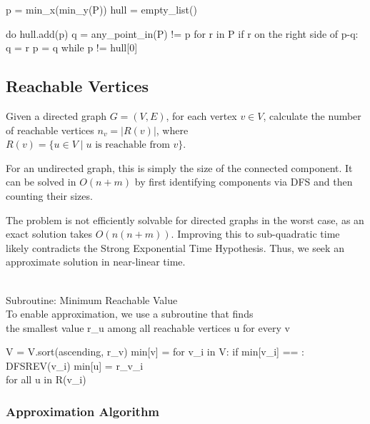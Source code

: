 \begin{codeexample}
	p = min_x(min_y(P))
	hull = empty_list()

	do {
			hull.add(p)
			q = any_point_in(P) != p
			for r in P {
					if r on the right side of p-q:
					q = r
				}
			p = q
		} while p != hull[0]
\end{codeexample}

\subsection{Reachable Vertices}

\begin{definition}
	Given a directed graph $G=(V, E)$, for each vertex $v \in V$, calculate the number of reachable vertices $n_v = |R(v)|$, where $R(v) = \{ u \in V \mid u \text{ is reachable from } v \}$.
\end{definition}

\begin{remark}
	For an undirected graph, this is simply the size of the connected component. It can be solved in $O(n+m)$ by first identifying components via DFS and then counting their sizes.
\end{remark}

\begin{remark}
	The problem is not efficiently solvable for directed graphs in the worst case, as an exact solution takes $O(n(n+m))$. Improving this to sub-quadratic time likely contradicts the Strong Exponential Time Hypothesis. Thus, we seek an approximate solution in near-linear time.
\end{remark}

\begin{algorithm}
	\\Subroutine: Minimum Reachable Value
	\\To enable approximation, we use a subroutine that finds
	\\the smallest value r_u among all reachable vertices u for every v

	V = V.sort(ascending, r_v)
	min[v] = \infty
	for v_i in V:
	if min[v_i] == \infty:
	DFSREV(v_i)
	min[u] = r_{v_i} \\for all u in R(v_i)

\end{algorithm}

\subsubsection{Approximation Algorithm}

